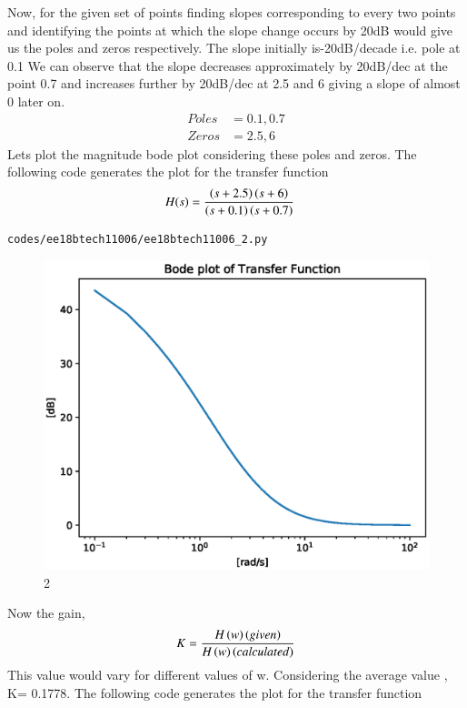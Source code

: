 \begin{enumerate}[label=\thesubsection.\arabic*.,ref=\thesubsection.\theenumi]
Now, for the given set of points finding slopes corresponding to every two points and identifying the points at which the slope change occurs by 20dB would give us the poles and zeros respectively.
The slope initially is-20dB/decade i.e. pole at 0.1 
We can observe that the slope decreases approximately by 20dB/dec at the point 0.7 and increases further by 20dB/dec at 2.5 and 6 giving a slope of almost 0 later on. 
\begin{align}
Poles&= 0.1,0.7\\
Zeros&= 2.5,6
\end{align}
Lets plot the magnitude bode plot considering these poles and zeros.
The following code generates the plot for the transfer function
\begin{align}
H(s) &= \frac{\left(s+2.5\right)\left(s+6\right)}{\left(s+0.1\right)\left(s+0.7\right)}
\end{align}
\begin{lstlisting}
codes/ee18btech11006/ee18btech11006_2.py
\end{lstlisting}
\begin{figure}[!ht]
\centering
\includegraphics[width=\columnwidth]{./figs/ee18btech11006/ee18btech11006_2.eps}
\caption{2}
\label{fig:ee18btech11006_2}
\end{figure}
Now the gain,
\begin{align}
K=\frac{H\left(w\right)\left(given\right)}{H\left(w\right)\left(calculated\right)} 
\end{align}
This value would vary for different values of w.
Considering the average value , K= 0.1778. 
The following code generates the plot for the transfer function

\end{enumerate}
